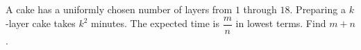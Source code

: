 A cake has a uniformly chosen number of layers from $1$ through $18$. Preparing a $k$-layer cake takes $k^2$ minutes. The expected time is $\dfrac{m}{n}$ in lowest terms. Find $m+n$.
